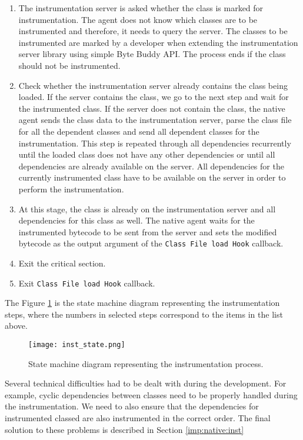 \begin{enumerate}
	\item The instrumentation server is asked whether the class is marked for instrumentation. The agent does not know which classes are to be instrumented and therefore, it needs to query the server. The classes to be instrumented are marked by a developer when extending the instrumentation server library using simple Byte Buddy API. The process ends if the class should not be instrumented.
	
	\item Check whether the instrumentation server already contains the class being loaded. If the server contains the class, we go to the next step and wait for the instrumented class. If the server does not contain the class, the native agent sends the class data to the instrumentation server, parse the class file for all the dependent classes and send all dependent classes for the instrumentation. This step is repeated through all dependencies recurrently until the loaded class does not have any other dependencies or until all dependencies are already available on the server. All dependencies for the currently instrumented class have to be available on the server in order to perform the instrumentation.

	\item At this stage, the class is already on the instrumentation server and all dependencies for this class as well. The native agent waits for the instrumented bytecode to be sent from the server and sets the modified bytecode as the output argument of the \texttt{Class File load Hook} callback.
	
	\item Exit the critical section.
	\item Exit \texttt{Class File load Hook} callback.
\end{enumerate}
The Figure \ref{fig:inst_state} is the state machine diagram representing the instrumentation steps, where the numbers in selected steps correspond to the items in the list above.
	\begin{figure}
		\centering
		\texttt{[image: inst\_state.png]}
		\caption{State machine diagram representing the instrumentation process.}
		\label{fig:inst_state}
	\end{figure}
	
Several technical difficulties had to be dealt with during the development. For example, cyclic dependencies between classes need to be properly handled during the instrumentation. We need to also ensure that the dependencies for instrumented classed are also instrumented in the correct order. The final solution to these problems is described in Section \ref{imp:native:inst}

